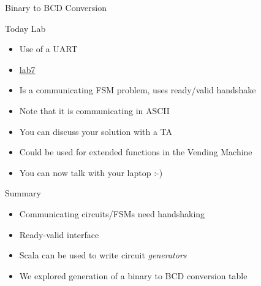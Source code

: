 \begin{frame}[fragile]{Binary to BCD Conversion}
\end{frame}

\begin{frame}[fragile]{Today Lab}
\begin{itemize}
\item Use of a UART
\item \href{https://github.com/schoeberl/chisel-lab/tree/master/lab7}{lab7}
\item Is a communicating FSM problem, uses ready/valid handshake
\item Note that it is communicating in ASCII
\item You can discuss your solution with a TA
\item Could be used for extended functions in the Vending Machine
\item You can now talk with your laptop :-)
\end{itemize}
\end{frame}


\begin{frame}[fragile]{Summary}
\begin{itemize}
\item Communicating circuits/FSMs need handshaking
\item Ready-valid interface
\item Scala can be used to write circuit \emph{generators}
\item We explored generation of a binary to BCD conversion table
\end{itemize}
\end{frame}





